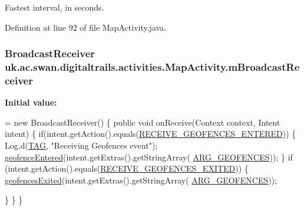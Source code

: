 Fastest interval, in seconds. 



Definition at line 92 of file Map\+Activity.\+java.

\hypertarget{classuk_1_1ac_1_1swan_1_1digitaltrails_1_1activities_1_1_map_activity_aaa47048b323cdbfc604d4405e9f9d33a}{
\subsubsection[{m\+Broadcast\+Receiver}]{\setlength{\rightskip}{0pt plus 5cm}Broadcast\+Receiver uk.\+ac.\+swan.\+digitaltrails.\+activities.\+Map\+Activity.\+m\+Broadcast\+Receiver\hspace{0.3cm}{\ttfamily [private]}}}\label{classuk_1_1ac_1_1swan_1_1digitaltrails_1_1activities_1_1_map_activity_aaa47048b323cdbfc604d4405e9f9d33a}
{\bfseries Initial value\+:}
\begin{DoxyCode}
= \textcolor{keyword}{new} BroadcastReceiver() \{
        \textcolor{keyword}{public} \textcolor{keywordtype}{void} onReceive(Context context, Intent intent) \{
            \textcolor{keywordflow}{if}(intent.getAction().equals(\hyperlink{classuk_1_1ac_1_1swan_1_1digitaltrails_1_1activities_1_1_map_activity_a7f2056604f7a13b22f2a9e5328448fba}{RECEIVE\_GEOFENCES\_ENTERED})) \{
                Log.d(\hyperlink{classuk_1_1ac_1_1swan_1_1digitaltrails_1_1activities_1_1_map_activity_a602c8e98476fa0a148b49d61f62501dc}{TAG}, \textcolor{stringliteral}{"Receiving Geofences event"});
                \hyperlink{classuk_1_1ac_1_1swan_1_1digitaltrails_1_1activities_1_1_map_activity_a98659c22951ea2dd6dd7eef2745a7ee8}{geofenceEntered}(intent.getExtras().getStringArray(
      \hyperlink{classuk_1_1ac_1_1swan_1_1digitaltrails_1_1activities_1_1_map_activity_af83f73ddb139f99dbdf40d4849b13bf9}{ARG\_GEOFENCES}));
            \}
            \textcolor{keywordflow}{if} (intent.getAction().equals(\hyperlink{classuk_1_1ac_1_1swan_1_1digitaltrails_1_1activities_1_1_map_activity_a8e2d03d80668ec761b99a7e48063327d}{RECEIVE\_GEOFENCES\_EXITED})) \{
                \hyperlink{classuk_1_1ac_1_1swan_1_1digitaltrails_1_1activities_1_1_map_activity_aaeb52643e73deb39b56a3c6cdbdc79c5}{geofencesExited}(intent.getExtras().getStringArray(
      \hyperlink{classuk_1_1ac_1_1swan_1_1digitaltrails_1_1activities_1_1_map_activity_af83f73ddb139f99dbdf40d4849b13bf9}{ARG\_GEOFENCES}));

            \}
        \}
    \}
\end{DoxyCode}


